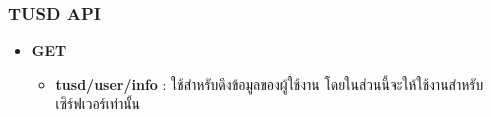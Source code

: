 \subsubsection{TUSD API}

\ifenglish
\else
\begin{itemize}
    \item \textbf{GET}
    \begin{itemize}
        \item \textbf{tusd/user/info} : ใช้สำหรับดึงข้อมูลของผู้ใช้งาน โดยในส่วนนี้จะให้ใช้งานสำหรับเซิร์ฟเวอร์เท่านั้น
    \end{itemize}
\end{itemize}
\fi

\clearpage